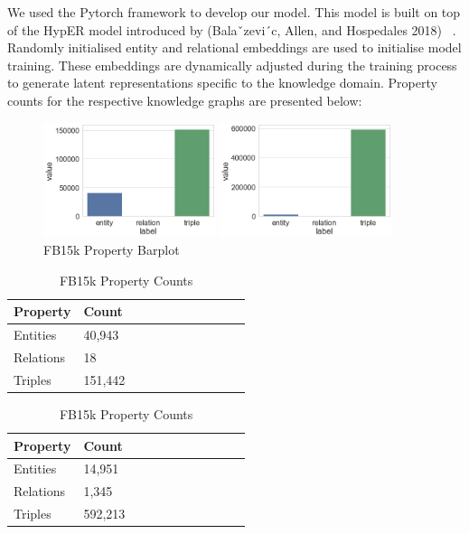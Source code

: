 We used the Pytorch framework to develop our model. This model is built on top of the HypER model introduced by (Balaˇzevi´c, Allen, and Hospedales 2018) ~\citep{balazevic2019hypernetwork}.  Randomly initialised entity and relational embeddings are used to initialise model training. These embeddings are dynamically adjusted during the training process to generate latent representations specific to the knowledge domain. Property counts for the respective knowledge graphs are presented below:

\begin{figure}[H]
	\parbox{.5\linewidth}{
   		\caption{WN18 Property Barplot}
   		\centering
    		\includegraphics[width=0.45\textwidth]{WN18_Counts}
		}
	\hfill
	\parbox{.5\linewidth}{
		\caption{FB15k Property Barplot}
   		\centering
    		\includegraphics[width=0.45\textwidth]{FB15k_Counts}
		}
\end{figure}

\begin{table}[H]
	\parbox{.5\linewidth}{
		\caption{WN18 Property Counts}
		\centering
		\begin{tabular}{lllllllllll}
  			\textbf{Property} & \textbf{Count}  \\
  			\hline
  			Entities & 40,943  \\
  			Relations & 18  \\
  			Triples & 151,442 \\
		\end{tabular}
		}
	\hfill
	\parbox{.5\linewidth}{
		\caption{FB15k Property Counts}
		\centering
		\begin{tabular}{lllllllllll}
  			\textbf{Property} & \textbf{Count}  \\
  			\hline
  			Entities & 14,951   \\
  			Relations & 1,345  \\
  			Triples & 592,213  \\
		\end{tabular}
		}
\end{table}

